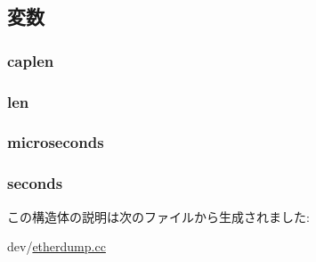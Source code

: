 \subsection{変数}
\hypertarget{structpcap__pkthdr_a924ae36d85e1e33da9650b316262a990}{
\subsubsection[{caplen}]{ {\bf caplen}}}
\label{structpcap__pkthdr_a924ae36d85e1e33da9650b316262a990}
\hypertarget{structpcap__pkthdr_a96bbf959016e4411c9e6b9812a8be60a}{
\subsubsection[{len}]{ {\bf len}}}
\label{structpcap__pkthdr_a96bbf959016e4411c9e6b9812a8be60a}
\hypertarget{structpcap__pkthdr_a147625fbb638ec48118787a657c79063}{
\subsubsection[{microseconds}]{ {\bf microseconds}}}
\label{structpcap__pkthdr_a147625fbb638ec48118787a657c79063}
\hypertarget{structpcap__pkthdr_a6d5694839ec935781627e5c52de21fda}{
\subsubsection[{seconds}]{ {\bf seconds}}}
\label{structpcap__pkthdr_a6d5694839ec935781627e5c52de21fda}


この構造体の説明は次のファイルから生成されました:\begin{DoxyCompactItemize}
\item 
dev/\hyperlink{etherdump_8cc}{etherdump.cc}\end{DoxyCompactItemize}
